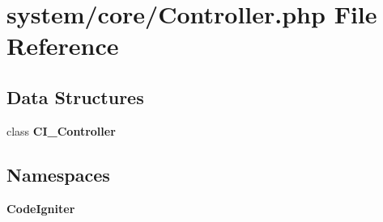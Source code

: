 \section{system/core/\-Controller.php File Reference}
\label{_controller_8php}
\subsection*{Data Structures}
\begin{DoxyCompactItemize}
\item 
class {\bf C\-I\-\_\-\-Controller}
\end{DoxyCompactItemize}
\subsection*{Namespaces}
\begin{DoxyCompactItemize}
\item 
{\bf Code\-Igniter}
\end{DoxyCompactItemize}
